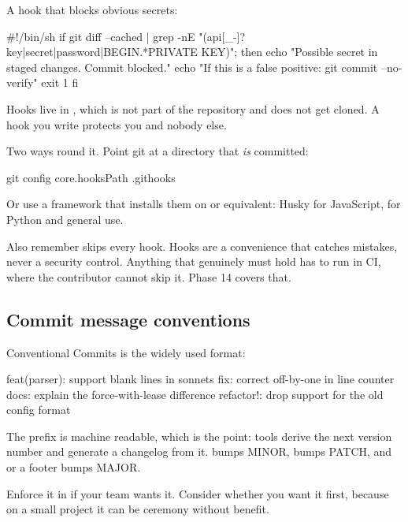 \documentclass[11pt]{article}
\begin{document}
A  hook that blocks obvious secrets:

\begin{terminal}
#!/bin/sh
if git diff --cached | grep -nE "(api[_-]?key|secret|password|BEGIN.*PRIVATE KEY)"; then
  echo "Possible secret in staged changes. Commit blocked."
  echo "If this is a false positive: git commit --no-verify"
  exit 1
fi
\end{terminal}

\begin{trap}
Hooks live in , which is not part of the repository and does not get
cloned. A hook you write protects you and nobody else.

Two ways round it. Point git at a directory that \emph{is} committed:

\begin{shell}
git config core.hooksPath .githooks
\end{shell}

Or use a framework that installs them on  or equivalent: Husky for
JavaScript,  for Python and general use.

Also remember  skips every hook. Hooks are a convenience that catches
mistakes, never a security control. Anything that genuinely must hold has to run in
CI, where the contributor cannot skip it. Phase 14 covers that.
\end{trap}

\subsection{Commit message conventions}

Conventional Commits is the widely used format:

\begin{terminal}
feat(parser): support blank lines in sonnets
fix: correct off-by-one in line counter
docs: explain the force-with-lease difference
refactor!: drop support for the old config format
\end{terminal}

The prefix is machine readable, which is the point: tools derive the next version
number and generate a changelog from it.  bumps MINOR,  bumps
PATCH, and \co{!} or a  footer bumps MAJOR.

Enforce it in  if your team wants it. Consider whether you want it
first, because on a small project it can be ceremony without benefit.
\end{document}
